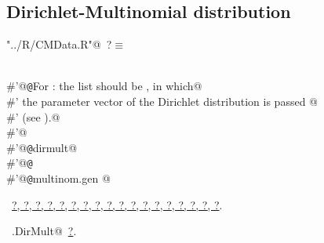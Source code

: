 \documentclass[reqno]{amsart}
\renewcommand{\NWtarget}[2]{\hypertarget{#1}{#2}}
\renewcommand{\NWlink}[2]{\hyperlink{#1}{#2}}
\begin{document}
\subsection{Dirichlet-Multinomial distribution}
\begin{flushleft} \small\label{scrap13}\raggedright\small
\NWtarget{nuweb?}{} \verb@"../R/CMData.R"@\nobreak\ {\footnotesize {?}}$\equiv$
\vspace{-1ex}
\begin{list}{}{} \item
\mbox{}\verb@@\\
\mbox{}\verb@#'@{\tt @}\verb@details For : the  list should be , in which@\\
\mbox{}\verb@#' the parameter vector of the Dirichlet distribution is passed @\\
\mbox{}\verb@#' (see ).@\\
\mbox{}\verb@#'@\\
\mbox{}\verb@#'@{\tt @}\verb@import dirmult@\\
\mbox{}\verb@#'@{\tt @}\verb@export@\\
\mbox{}\verb@#'@{\tt @}\verb@rdname multinom.gen @\\
\mbox{}\verb@@{\NWsep}
\end{list}
\vspace{-1.5ex}
\footnotesize
\begin{list}{}{\setlength{\itemsep}{-\parsep}\setlength{\itemindent}{-\leftmargin}}
\item \NWtxtFileDefBy\ \NWlink{nuweb?}{?}\NWlink{nuweb?}{, ?}\NWlink{nuweb?}{, ?}\NWlink{nuweb?}{, ?}\NWlink{nuweb?}{, ?}\NWlink{nuweb?}{, ?}\NWlink{nuweb?}{, ?}\NWlink{nuweb?}{, ?}\NWlink{nuweb?}{, ?}\NWlink{nuweb?}{, ?}\NWlink{nuweb?}{, ?}\NWlink{nuweb?}{, ?}\NWlink{nuweb?}{, ?}\NWlink{nuweb?}{, ?}\NWlink{nuweb?}{, ?}\NWlink{nuweb?}{, ?}\NWlink{nuweb?}{, ?}\NWlink{nuweb?}{, ?}.
\item \NWtxtIdentsUsed\nobreak\  \verb@mg.DirMult@\nobreak\ \NWlink{nuweb?}{?}.
\item{}
\end{list}
\vspace{4ex}
\end{flushleft}
\end{document}

